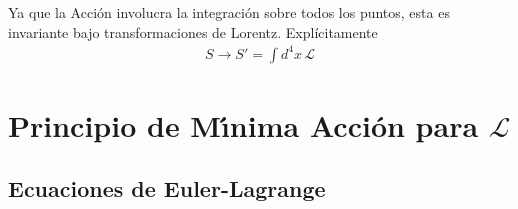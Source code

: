 Ya que la Acción involucra la integración sobre todos los puntos, esta es invariante bajo transformaciones de Lorentz. Explícitamente
\begin{align}
  S\to S'=\int d^4x\, \mathcal{L}
\end{align}







\section{Principio de M\'\i nima Acci\'on para $\mathcal{L}$}
\label{sec:principio-de-minima-call}
\subsection{Ecuaciones de Euler-Lagrange}

